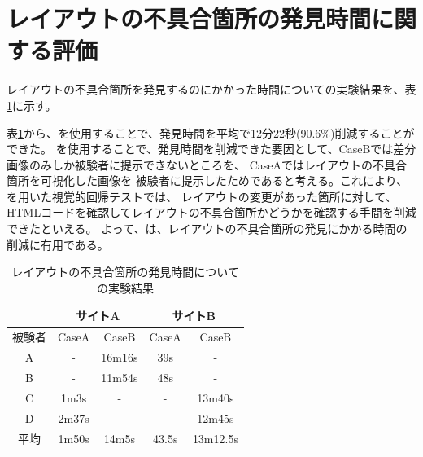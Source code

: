 \section{レイアウトの不具合箇所の発見時間に関する評価}\label{subsec:evalue_required_time}
レイアウトの不具合箇所を発見するのにかかった時間についての実験結果を、表\ref{fig: 6_1}に示す。

表\ref{fig: 6_1}から、\toolName を使用することで、発見時間を平均で12分22秒(90.6\%)削減することができた。
\toolName を使用することで、発見時間を削減できた要因として、CaseBでは差分画像のみしか被験者に提示できないところを、
CaseAではレイアウトの不具合箇所を可視化した画像を
被験者に提示したためであると考える。これにより、\toolName を用いた視覚的回帰テストでは、
レイアウトの変更があった箇所に対して、
HTMLコードを確認してレイアウトの不具合箇所かどうかを確認する手間を削減できたといえる。
よって、\toolName は、レイアウトの不具合箇所の発見にかかる時間の削減に有用である。

\begin{table}[h]
    \centering
    \caption{レイアウトの不具合箇所の発見時間についての実験結果}
    \label{fig: 6_1}
    \begin{tabular}{c||c|c|c|c}
               & \multicolumn{2}{|c|}{\textbf{サイトA}}
               & \multicolumn{2}{|c}{\textbf{サイトB}}                              \\
        \hline \hline
        被験者 & CaseA                                  & CaseB  & CaseA & CaseB    \\
        \hline \hline
        A      & -                                      & 16m16s & 39s   & -        \\
        B      & -                                      & 11m54s & 48s   & -        \\
        C      & 1m3s                                   & -      & -     & 13m40s   \\
        D      & 2m37s                                  & -      & -     & 12m45s   \\
        \hline
        平均   & 1m50s                                  & 14m5s  & 43.5s & 13m12.5s \\
    \end{tabular}
\end{table}


